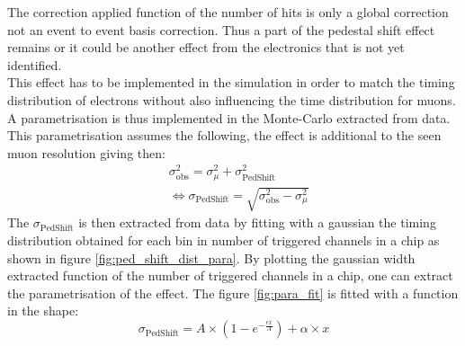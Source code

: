 \documentclass[twoside,a4paper,11pt]{article}
\begin{document}
\begin{appendix}
The correction applied function of the number of hits is only a global correction not an event to event basis correction. Thus a part of the pedestal shift effect remains or it could be another effect from the electronics that is not yet identified.\\
This effect has to be implemented in the simulation in order to match the timing distribution of electrons without also influencing the time distribution for muons. A parametrisation is thus implemented in the Monte-Carlo extracted from data. This parametrisation assumes the following, the effect is additional to the seen muon resolution giving then:
\begin{equation*}
\begin{split}
& \sigma_{\text{obs}}^2 = \sigma_{\mu}^2 + \sigma_{\text{PedShift}}^2 \\
& \Leftrightarrow \sigma_{\text{PedShift}} = \sqrt{\sigma_{\text{obs}}^2 - \sigma_{\mu}^2}
\end{split}
\end{equation*}
The $\sigma_{\text{PedShift}}$ is then extracted from data by fitting with a gaussian the timing distribution obtained for each bin in number of triggered channels in a chip as shown in figure \ref{fig:ped_shift_dist_para}. By plotting the gaussian width extracted function of the number of triggered channels in a chip, one can extract the parametrisation of the effect. The figure \ref{fig:para_fit} is fitted with a function in the shape:
\begin{equation*}
\sigma_{\text{PedShift}} = A \times ( 1 - e^{-\frac{\epsilon x}{A}} ) + \alpha \times x
\end{equation*}
\begin{figure}[htbp]
	\hfill

\end{figure}
\end{appendix}
\end{document}
